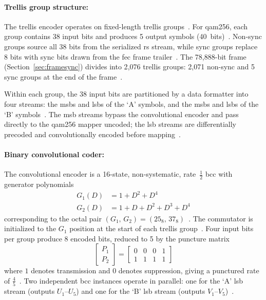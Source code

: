 \paragraph{Trellis group structure:}
The trellis encoder operates on fixed-length trellis
groups~\cite{ITU_J83}.
For \ac{qam256}, each group contains 38 input bits and produces
5 output symbols (40~bits)~\cite{ITU_J83}.
Non-sync groups source all 38 bits from the serialized \ac{rs}
stream, while sync groups replace 8 bits with sync bits drawn
from the \ac{fec} frame trailer~\cite{ITU_J83}.
The 78{,}888-bit frame (Section~\ref{sec:framesync}) divides
into 2{,}076 trellis groups: 2{,}071 non-sync and 5 sync groups
at the end of the frame~\cite{ITU_J83}.

Within each group, the 38 input bits are partitioned by a data
formatter into four streams: the \ac{msb}s and \ac{lsb}s of the
`A' symbols, and the \ac{msb}s and \ac{lsb}s of the `B'
symbols~\cite{ITU_J83}.
The \ac{msb} streams bypass the convolutional encoder and pass
directly to the \ac{qam256} mapper uncoded; the \ac{lsb} streams
are differentially precoded and convolutionally encoded before
mapping~\cite{ITU_J83}.

\paragraph{Binary convolutional coder:}
The convolutional encoder is a 16-state, non-systematic,
rate~$\frac{1}{2}$ \ac{bcc} with generator
polynomials~\cite{ITU_J83}
\begin{align}
  G_1(D) &= 1 + D^2 + D^4
  \label{eq:bcc_g1} \\
  G_2(D) &= 1 + D + D^2 + D^3 + D^4
  \label{eq:bcc_g2}
\end{align}
\noindent corresponding to the octal pair
$(G_1,\,G_2) = (25_8,\,37_8)$~\cite{ITU_J83}.
The commutator is initialized to the $G_1$ position at the start
of each trellis group~\cite{ITU_J83}.
Four input bits per group produce 8 encoded bits, reduced to 5
by the puncture matrix~\cite{ITU_J83}
\begin{equation}
  \begin{bmatrix} P_1 \\ P_2 \end{bmatrix}
  =
  \begin{bmatrix} 0 & 0 & 0 & 1 \\ 1 & 1 & 1 & 1 \end{bmatrix}
  \label{eq:bcc_puncture}
\end{equation}
\noindent where $1$ denotes transmission and $0$ denotes
suppression, giving a punctured rate of $\frac{4}{5}$~\cite{ITU_J83}.
Two independent \ac{bcc} instances operate in parallel: one for
the `A' \ac{lsb} stream (outputs $U_1$--$U_5$) and one for the
`B' \ac{lsb} stream (outputs $V_1$--$V_5$)~\cite{ITU_J83}.

